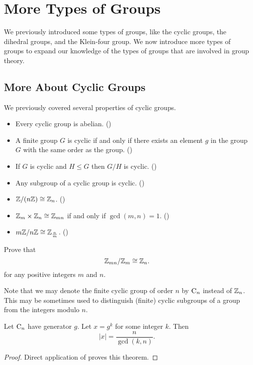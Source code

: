 \chapter{More Types of Groups}
We previously introduced some types of groups, like the cyclic groups, the dihedral groups, and the Klein-four group. We now introduce more types of groups to expand our knowledge of the types of groups that are involved in group theory.

\section{More About Cyclic Groups}\label{section-more-about-cyclic-groups}
We previously covered several properties of cyclic groups.
\begin{itemize}
    \item Every cyclic group is abelian. ()
    \item A finite group $G$ is cyclic if and only if there exists an element $g$ in the group $G$ with the same order as the group. ()
    \item If $G$ is cyclic and $H \leq G$ then $G/H$ is cyclic. ()
    \item Any subgroup of a cyclic group is cyclic. ()
    \item $\mathbb{Z} / (n\mathbb{Z}) \cong \mathbb{Z}_n$. ()
    \item $\mathbb{Z}_m \times \mathbb{Z}_n \cong \mathbb{Z}_{mn}$ if and only if $\gcd(m,n) = 1$. ()
    \item $m\mathbb{Z} / n\mathbb{Z} \cong \mathbb{Z}_{\frac nm}$. ()
\end{itemize}

\begin{exercise}\label{exercise-Zmn-mod-Zn-cong-Zn}
    Prove that
    \[
        \mathbb{Z}_{mn} / \mathbb{Z}_m \cong \mathbb{Z}_n.
    \]
    for any positive integers $m$ and $n$.
\end{exercise}

Note that we may denote the finite cyclic group of order $n$ by $\mathrm{C}_{n}$ instead of $\mathbb{Z}_n$. This may be sometimes used to distinguish (finite) cyclic subgroups of a group from the integers modulo $n$.

\begin{theorem}\label{thrm-order-of-element-in-cyclic-group}
    Let $\mathrm{C}_{n}$ have generator $g$. Let $x = g^k$ for some integer $k$. Then
    \[
        |x| = \frac{n}{\gcd(k,n)}.
    \]
\end{theorem}
\begin{proof}
    Direct application of  proves this theorem.
\end{proof}

